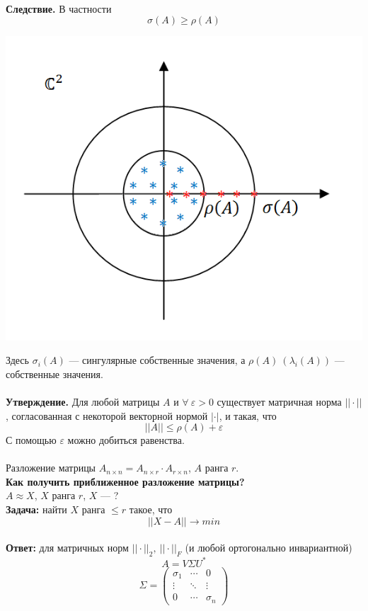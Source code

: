 \documentclass[12pt]{article}
\theoremstyle{definition}
\numberwithin{equation}{section}
\begin{document}
\\
\textbf{Следствие.} В частности $$\sigma(A)\geqslant \rho(A)$$
\begin{center}
\includegraphics[scale=0.6]{l8_3.png}\end{center}
Здесь $\sigma_i(A)$ --- сингулярные собственные значения, а $\rho(A)~(\lambda_i(A))$ --- собственные значения.\\ \\
\textbf{Утверждение.} Для любой матрицы $A$ и $\forall~ \varepsilon>0$ существует матричная норма $||\cdot ||$, согласованная с некоторой векторной нормой $|\cdot|$, и такая, что $$||A||\leqslant \rho(A) + \varepsilon$$
С помощью $\varepsilon$ можно добиться равенства.\\
\\
Разложение матрицы $A_{n \times n}=A_{n \times r} \cdot A_{r \times
n}$, $A$ ранга $r$.\\
\textbf{Как получить приближенное разложение матрицы?}\\
$A\approx X$, $X$ ранга $r$, $X$ --- ?\\
\textbf{Задача:} найти $X$ ранга $\leqslant r$ такое, что $$||X-A||\to min$$\\
\textbf{Ответ:} для матричных норм $||\cdot||_2,~||\cdot||_F$ (и любой ортогонально инвариантной) $$A=V\Sigma U^*$$
\[\Sigma=\begin{pmatrix}
\sigma_1 & \cdots & 0\\
\vdots & \ddots & \vdots\\
0 & \cdots & \sigma_n
\end{pmatrix}\]
\end{document}
